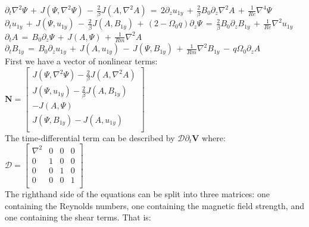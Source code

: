 \documentclass[letterpaper,12pt]{article}
\newcommand\reye{\mathrel{Re}}
\newcommand\reym{\mathrel{Rm}}
\begin{document}
$\partial_t \nabla^2 \Psi \, + \, J\left(\Psi, \nabla^2 \Psi\right) \, - \, \frac{2}{\beta}J\left(A, \nabla^2 A \right) \, =  \, 2 \partial_z u_{1y} \,+ \, \frac{2}{\beta} B_0 \partial_z \nabla^2 A \, + \, \frac{1}{\reye}\nabla^4 \Psi$ \\

$\partial_t u_{1y} \, + \, J\left(\Psi, u_{1y}\right) \, - \, \frac{2}{\beta} J\left(A, B_{1y}\right) \, + \, \left(2 - \Omega_0 q\right) \partial_z \Psi \, = \, \frac{2}{\beta}B_0\partial_z B_{1y} \, + \, \frac{1}{\reye} \nabla^2 u_{1y}$ \\

$\partial_t A \, = \, B_0 \partial_z \Psi \, + \, J\left(A, \Psi\right) \, + \, \frac{1}{Rm} \nabla^2 A$ \\

$\partial_t B_{1y} \, = \, B_0 \partial_z u_{1y} \, + \, J\left(A, u_{1y}\right) \, - \, J\left(\Psi, B_{1y}\right) \, + \, \frac{1}{\reym} \nabla^2 B_{1y}  \, - \, q \Omega_0 \partial_z A$ \\

First we have a vector of nonlinear terms:\\

$\mathbf{N} = \left[ \begin{matrix}  J(\Psi, \nabla^2 \Psi) - \frac{2}{\beta}J(A, \nabla^2 A)\\
J(\Psi, u_{1y}) - \frac{2}{\beta} J(A, B_{1y}) \\ 
-J(A, \Psi) \\
J(\Psi, B_{1y}) - J(A, u_{1y}) \\
\end{matrix} \right]$ \\

The time-differential term can be described by $\mathcal{D}\partial_t \mathbf{V}$ where: \\

$\mathcal{D} = \left[\begin{matrix}
\nabla^2 & 0 & 0 & 0 \\
0 & 1& 0 & 0 \\
0 & 0 & 1 & 0\\
0 & 0 & 0 & 1 \\
\end{matrix}\right]$ \\

The righthand side of the equations can be split into three matrices: one containing the Reynolds numbers, one containing the magnetic field strength, and one containing the shear terms. That is: \\
\end{document}
